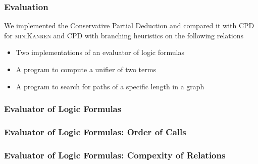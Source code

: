 \documentclass[xcolor=table]{beamer}
\newcommand{\mk}{\textsc{miniKanren}\xspace}
\begin{document}
\begin{frame}[fragile]
  \frametitle{Evaluation}
We implemented the Conservative Partial Deduction and compared it with CPD for \mk and CPD with branching heuristics on the following relations

\begin{itemize}
  \item Two implementations of an evaluator of logic formulas
  \item A program to compute a unifier of two terms
  \item A program to search for paths of a specific length in a graph
\end{itemize}
\end{frame}

\begin{frame}[fragile]
  \frametitle{Evaluator of Logic Formulas}
    \begin{center}
      {
        \begin{minipage}[c]{\textwidth}
          
        \end{minipage}
      }
    \end{center}
\end{frame}

\begin{frame}[fragile]
  \frametitle{Evaluator of Logic Formulas: Order of Calls}
    \begin{center}
      {
        \begin{minipage}[c]{\textwidth}
          
        \end{minipage}
      }
    \end{center}

    \begin{center}
      {
        \begin{minipage}[c]{\textwidth}
          
        \end{minipage}
      }
    \end{center}
\end{frame}

\begin{frame}[fragile]
  \frametitle{Evaluator of Logic Formulas: Compexity of Relations}

  \begin{center}
    {
      \begin{minipage}[c]{0.8\textwidth}
        
      \end{minipage}
    }
  \end{center}


  \begin{center}
    {
      \begin{minipage}[c]{0.8\textwidth}
        
      \end{minipage}
    }
  \end{center}

\end{frame}
\end{document}
